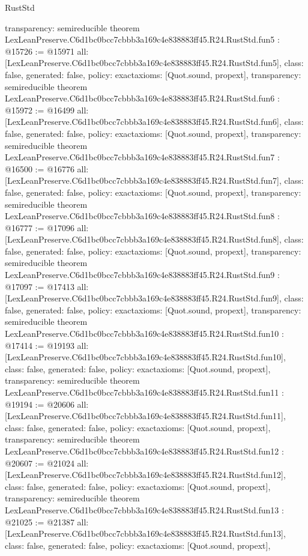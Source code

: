 \begin{lexlean}{RustStd}
\begin{coremodule}
{  transparency: semireducible
}
theorem LexLeanPreserve.C6d1bc0bcc7cbbb3a169c4e838883ff45.R24.RustStd.fun5 : @15726 := @15971 {
  all: [LexLeanPreserve.C6d1bc0bcc7cbbb3a169c4e838883ff45.R24.RustStd.fun5],
  class: false,
  generated: false,
  policy: exact{axioms: [Quot.sound, propext]},
  transparency: semireducible
}
theorem LexLeanPreserve.C6d1bc0bcc7cbbb3a169c4e838883ff45.R24.RustStd.fun6 : @15972 := @16499 {
  all: [LexLeanPreserve.C6d1bc0bcc7cbbb3a169c4e838883ff45.R24.RustStd.fun6],
  class: false,
  generated: false,
  policy: exact{axioms: [Quot.sound, propext]},
  transparency: semireducible
}
theorem LexLeanPreserve.C6d1bc0bcc7cbbb3a169c4e838883ff45.R24.RustStd.fun7 : @16500 := @16776 {
  all: [LexLeanPreserve.C6d1bc0bcc7cbbb3a169c4e838883ff45.R24.RustStd.fun7],
  class: false,
  generated: false,
  policy: exact{axioms: [Quot.sound, propext]},
  transparency: semireducible
}
theorem LexLeanPreserve.C6d1bc0bcc7cbbb3a169c4e838883ff45.R24.RustStd.fun8 : @16777 := @17096 {
  all: [LexLeanPreserve.C6d1bc0bcc7cbbb3a169c4e838883ff45.R24.RustStd.fun8],
  class: false,
  generated: false,
  policy: exact{axioms: [Quot.sound, propext]},
  transparency: semireducible
}
theorem LexLeanPreserve.C6d1bc0bcc7cbbb3a169c4e838883ff45.R24.RustStd.fun9 : @17097 := @17413 {
  all: [LexLeanPreserve.C6d1bc0bcc7cbbb3a169c4e838883ff45.R24.RustStd.fun9],
  class: false,
  generated: false,
  policy: exact{axioms: [Quot.sound, propext]},
  transparency: semireducible
}
theorem LexLeanPreserve.C6d1bc0bcc7cbbb3a169c4e838883ff45.R24.RustStd.fun10 : @17414 := @19193 {
  all: [LexLeanPreserve.C6d1bc0bcc7cbbb3a169c4e838883ff45.R24.RustStd.fun10],
  class: false,
  generated: false,
  policy: exact{axioms: [Quot.sound, propext]},
  transparency: semireducible
}
theorem LexLeanPreserve.C6d1bc0bcc7cbbb3a169c4e838883ff45.R24.RustStd.fun11 : @19194 := @20606 {
  all: [LexLeanPreserve.C6d1bc0bcc7cbbb3a169c4e838883ff45.R24.RustStd.fun11],
  class: false,
  generated: false,
  policy: exact{axioms: [Quot.sound, propext]},
  transparency: semireducible
}
theorem LexLeanPreserve.C6d1bc0bcc7cbbb3a169c4e838883ff45.R24.RustStd.fun12 : @20607 := @21024 {
  all: [LexLeanPreserve.C6d1bc0bcc7cbbb3a169c4e838883ff45.R24.RustStd.fun12],
  class: false,
  generated: false,
  policy: exact{axioms: [Quot.sound, propext]},
  transparency: semireducible
}
theorem LexLeanPreserve.C6d1bc0bcc7cbbb3a169c4e838883ff45.R24.RustStd.fun13 : @21025 := @21387 {
  all: [LexLeanPreserve.C6d1bc0bcc7cbbb3a169c4e838883ff45.R24.RustStd.fun13],
  class: false,
  generated: false,
  policy: exact{axioms: [Quot.sound, propext]},
}
\end{coremodule}
\end{lexlean}
